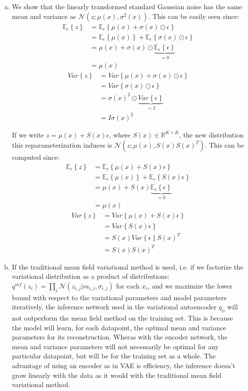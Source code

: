 \documentclass[paper=a4, fontsize=11pt]{scrartcl} %
\numberwithin{equation}{section} %
\numberwithin{figure}{section} %
\numberwithin{table}{section} %
\newcommand{\Ex}[2]{\mathbb{E}_{#1}\left\{#2\right\}}
\newcommand{\Var}[1]{Var\left\{#1\right\}}
\begin{document}
\begin{enumerate}[(a)]
	\item We show that the linearly transformed standard Gaussian noise has the same mean and variance as $\mathcal{N}(z; \mu(x), \sigma^2(x))$. This can be easily seen since:
	\begin{align*}
	\Ex{\epsilon}{z} &= \Ex{\epsilon}{\mu(x) + \sigma(x)\odot\epsilon}\\
	&= \Ex{\epsilon}{\mu(x)} + \Ex{\epsilon}{\sigma(x)\odot\epsilon}\\
	&= \mu(x) + \sigma(x)\odot\underbrace{\Ex{\epsilon}{\epsilon}}_{=0}\\
	&= \mu(x)
	\end{align*}
	\begin{align*}
	\Var{z} &= \Var{\mu(x) + \sigma(x)\odot\epsilon}\\
	&= \Var{\sigma(x)\odot\epsilon}\\
	&= \sigma(x)^2\odot\underbrace{\Var{\epsilon}}_{=I}\\
	&= I\sigma(x)^2
	\end{align*}
	
	If we write $z = \mu(x) + S(x)\epsilon$, where $S(x) \in \mathbb{R}^{K \times K}$, the new distribution this reparameterization induces is $\mathcal{N}(z; \mu(x), S(x)S(x)^T)$. This can be computed since:
		\begin{align*}
		\Ex{\epsilon}{z} &= \Ex{\epsilon}{\mu(x) + S(x)\epsilon}\\
		&= \Ex{\epsilon}{\mu(x)} + \Ex{\epsilon}{S(x)\epsilon}\\
		&= \mu(x) + S(x)\underbrace{\Ex{\epsilon}{\epsilon}}_{=0}\\
		&= \mu(x)
		\end{align*}
		\begin{align*}
		\Var{z} &= \Var{\mu(x) + S(x)\epsilon}\\
		&= \Var{S(x)\epsilon}\\
		&= S(x)\Var{\epsilon}S(x)^T\\
		&= S(x)S(x)^T
		\end{align*}
		
	\item If the traditional mean field variational method is used, i.e. if we factorize the variational distribution as a product of distributions: $q^{mf}(z_i) = \prod_{j} \mathcal{N}(z_{i,j} | m_{i,j} , \sigma_{i,j} )$ for each $x_i$, and we maximize the lower bound with respect to the variational parameters and model parameters iteratively, the inference network used in the variational autoencoder $q_{\phi}$ will not outperform the mean field method on the training set. This is because the model will learn, for each datapoint, the optimal mean and variance parameters for its reconstruction. Wheras with the encoder network, the mean and variance parameters will not necessarily be optimal for any particular datapoint, but will be for the training set as a whole. The advantage of using an encoder as in VAE is efficiency, the inference doesn't grow linearly with the data as it would with the traditional mean field variational method.
\end{enumerate}
\end{document}

